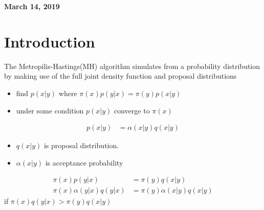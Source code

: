 \documentclass[11pt]{article}
\begin{document}
%

\newcommand{\Ito}{$It\hat{o}$'$s~Lemma$}

\newcommand\ind{\stackrel{\rm ind}{\sim}}
\newcommand\iid{\stackrel{\rm iid}{\sim}}
\renewcommand\c{\mathbf{c}}
\newcommand\y{\mathbf{y}}
\newcommand\z{\mathbf{z}}
\renewcommand\P{\mathbf{P}}
\newcommand\W{\mathbf{W}}
\newcommand\X{\mathbf{X}}
\newcommand\Y{\mathbf{Y}}
\newcommand\Z{\mathbf{Z}}
\newcommand\J{{\cal J}}
\newcommand\B{{\cal B}}
\newcommand\K{{\cal K}}
\newcommand\N{{\rm N}}
\newcommand\bs{\boldsymbol}
\newcommand\bth{\bs\theta}
\newcommand\bbe{\bs\beta}
\renewcommand\*{^\star}

\def\spacingset#1{\renewcommand{\baselinestretch}%
{#1}\small\normalsize} \spacingset{1}



  \bigskip
  \bigskip
  \bigskip
  \begin{center}
    {\LARGE\bf March 14, 2019 }
  \end{center}
  \medskip



\spacingset{1.45}


\section{Introduction}
The Metropilis-Hastings(MH) algorithm simulates from a probability distribution by making use of the full joint density function and proposal distributions

\begin{itemize}
	\item find $p(x|y)$ where $\pi(x)p(y|x) = \pi(y)p(x|y)$
	\item under some condition $p(x|y)$ converge to $\pi(x)$
\end{itemize}

\begin{align*}
p(x|y) &= \alpha(x|y) q(x|y)
\end{align*}

\begin{itemize}
	\item $q(x|y)$ is proposal distribution.
	\item $\alpha(x|y)$ is acceptance probability
\end{itemize}
\begin{align*}
\pi(x)p(y|x) &= \pi(y)q(x|y) \\
\pi(x) \alpha(y|x) q(y|x)& = \pi(y) \alpha(x|y) q(x|y)
\end{align*}
if $\pi(x)q(y|x) > \pi(y) q(x|y)$
\end{document}
